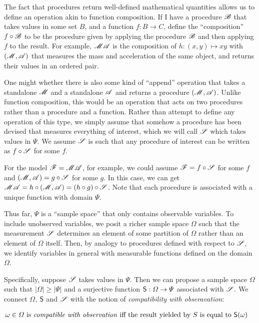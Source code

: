 The fact that procedures return well-defined mathematical quantities allows us to define an operation akin to function composition. If I have a procedure $\mathscr{B}$ that takes values in some set $B$, and a function $f:B\to C$, define the ``composition'' $f\circ \mathscr{B}$ to be the procedure given by applying the procedure $\mathscr{B}$ and then applying $f$ to the result. For example, $\mathscr{MA}$ is the composition of $h:(x,y)\mapsto xy$ with $(\mathscr{M},\mathscr{A})$ that measures the mass and acceleration of the same object, and returns their values in an ordered pair.

One might whether there is also some kind of ``append'' operation that takes a standalone $\mathscr{M}$ and a standalone $\mathscr{A}$ and returns a procedure $(\mathscr{M},\mathscr{A})$. Unlike function composition, this would be an operation that acts on two procedures rather than a procedure and a function. Rather than attempt to define any operation of this type, we simply assume that somehow a procedure has been devised that measures everything of interest, which we will call $\mathscr{S}$ which takes values in $\Psi$. We assume $\mathscr{S}$ is such that any procedure of interest can be written as $f\circ \mathscr{S}$ for some $f$.

For the model $\mathscr{F}=\mathscr{MA}$, for example, we could assume $\mathscr{F}=f\circ \mathscr{S}$ for some $f$ and $(\mathscr{M},\mathscr{A})=g\circ \mathscr{S}$ for some $g$. In this case, we can get $\mathscr{MA}=h\circ(\mathscr{M},\mathscr{A})=(h\circ g)\circ\mathscr{S}$. Note that each procedure is associated with a unique function with domain $\Psi$.

Thus far, $\Psi$ is a ``sample space'' that only contains observable variables. To include unobserved variables, we posit a richer sample space $\Omega$ such that the measurement $\mathscr{S}$ determines an element of some partition of $\Omega$ rather than an element of $\Omega$ itself. Then, by analogy to procedures defined with respect to $\mathscr{S}$, we identify variables in general with measurable functions defined on the domain $\Omega$. 

Specifically, suppose $\mathscr{S}$ takes values in $\Psi$. Then we can propose a sample space $\Omega$ such that $|\Omega|\geq |\Psi|$ and a surjective function $\mathsf{S}:\Omega\to \Psi$ associated with $\mathscr{S}$. We connect $\Omega$, $\mathsf{S}$ and $\mathscr{S}$ with the notion of \emph{compatibility with obseravation}:

\begin{align}
 &\omega\in \Omega\text{ is \emph{compatible with observation} iff the result yielded by }S\text{ is equal to }\mathsf{S}(\omega)\label{def:observable}
\end{align}


